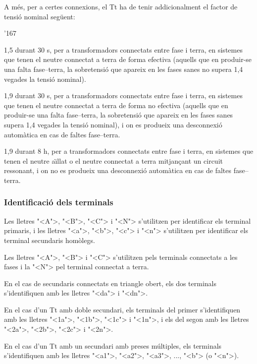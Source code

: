 A m\'{e}s, per a certes connexions, el Tt ha de tenir addicionalment el factor de tensi\'{o}
nominal seg\"{u}ent:
 \begin{dinglist}{'167}
   \item 1,5 durant 30 s,  per a transformadors connectats entre fase i terra, en sistemes que tenen el neutre connectat a terra de forma efectiva (aquells que en produir-se una falta fase--terra, la sobretensi\'{o} que apareix en les fases sanes no supera 1,4 vegades la tensi\'{o} nominal).
   \item 1,9 durant 30 s,  per a transformadors connectats entre fase i terra, en sistemes que tenen el neutre connectat a terra de forma no efectiva (aquells que en produir-se una falta fase--terra, la sobretensi\'{o} que apareix en les fases sanes  supera 1,4 vegades la tensi\'{o} nominal), i on es produeix una desconnexi\'{o} autom\`{a}tica  en cas de faltes fase--terra.
   \item 1,9 durant 8 h,  per a transformadors connectats entre fase i terra, en sistemes que tenen el neutre a\"{\i}llat o el neutre connectat a terra mitjan\c{c}ant un circuit ressonant, i on no es produeix una desconnexi\'{o} autom\`{a}tica  en cas de faltes fase--terra.
\end{dinglist}

\subsubsection{Identificaci\'{o} dels terminals}

 Les lletres {"<}A{">}, {"<}B{">}, {"<}C{">} i {"<}N{">} s'utilitzen per identificar els terminal primaris, i les lletres {"<}a{">}, {"<}b{">}, {"<}c{">} i {"<}n{">} s'utilitzen per identificar els terminal secundaris hom\`{o}legs.

 Les lletres {"<}A{">}, {"<}B{">} i {"<}C{">} s'utilitzen pels terminals connectats a les fases i la {"<}N{">} pel terminal connectat a terra.

 En el cas de secundaris connectats en triangle obert, els dos terminals s'identifiquen amb les lletres {"<}da{">} i {"<}dn{">}.

 En el cas d'un Tt amb doble secundari, els terminals del  primer s'identifiquen amb les lletres  {"<}1a{">}, {"<}1b{">}, {"<}1c{">} i {"<}1n{">}, i els del segon amb les lletres  {"<}2a{">}, {"<}2b{">}, {"<}2c{">} i {"<}2n{">}.

 En el cas d'un Tt amb un  secundari amb preses m\'{u}ltiples, els terminals s'identifiquen amb les lletres  {"<}a1{">}, {"<}a2{">}, {"<}a3{">}, ..., {"<}b{">} (o {"<}n{">}).


